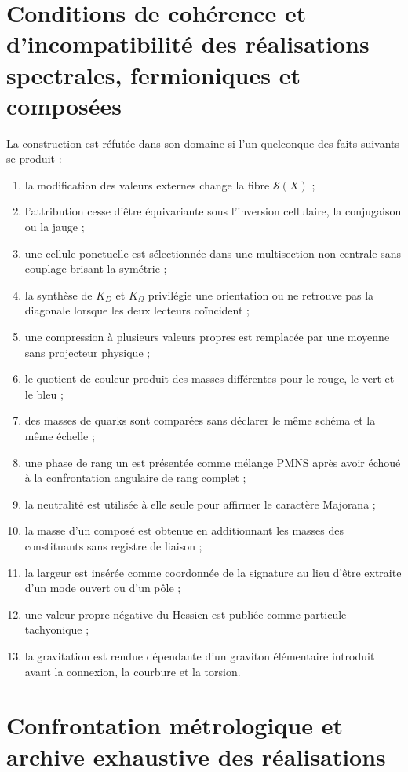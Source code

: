 \section{Conditions de cohérence et d'incompatibilité des réalisations spectrales, fermioniques et composées}

La construction est réfutée dans son domaine si l'un quelconque des
faits suivants se produit :

\begin{enumerate}
\item la modification des valeurs externes change la fibre \(\mathscr S(X)\) ;
\item l'attribution cesse d'être équivariante sous l'inversion cellulaire,
      la conjugaison ou la jauge ;
\item une cellule ponctuelle est sélectionnée dans une multisection non centrale sans
      couplage brisant la symétrie ;
\item la synthèse de \(K_D\) et \(K_\Omega\) privilégie une orientation ou ne
      retrouve pas la diagonale lorsque les deux lecteurs coïncident ;
\item une compression à plusieurs valeurs propres est remplacée par une moyenne sans
      projecteur physique ;
\item le quotient de couleur produit des masses différentes pour le rouge, le vert et le bleu ;
\item des masses de quarks sont comparées sans déclarer le même schéma et la même échelle ;
\item une phase de rang un est présentée comme mélange PMNS après avoir échoué à la
      confrontation angulaire de rang complet ;
\item la neutralité est utilisée à elle seule pour affirmer le caractère Majorana ;
\item la masse d'un composé est obtenue en additionnant les masses des constituants sans
      registre de liaison ;
\item la largeur est insérée comme coordonnée de la signature au lieu d'être extraite
      d'un mode ouvert ou d'un pôle ;
\item une valeur propre négative du Hessien est publiée comme particule tachyonique ;
\item la gravitation est rendue dépendante d'un graviton élémentaire introduit
      avant la connexion, la courbure et la torsion.
\end{enumerate}

\section{Confrontation métrologique et archive exhaustive des réalisations}

